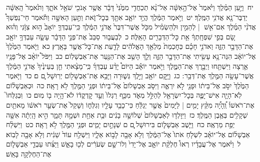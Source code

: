 \documentclass[18pt]{article}
\newcommand{\kri}[1]{\Afootnote{#1}}	%
\begin{document}
 {\loc יח~}וַיַּ֣עַן הַמֶּ֗לֶךְ וַיֹּ֙אמֶר֙ אֶל־הָ֣אִשָּׁ֔ה אַל־נָ֨א תְכַחֲדִ֤י מִמֶּ֙נִּי֙ דָּבָ֔ר אֲשֶׁ֥ר אָנֹכִ֖י שֹׁאֵ֣ל אֹתָ֑ךְ וַתֹּ֙אמֶר֙ הָֽאִשָּׁ֔ה יְדַבֶּר־נָ֖א אֲדֹנִ֥י הַמֶּֽלֶךְ׃ \startlock
 {\loc יט~}וַיֹּ֣אמֶר הַמֶּ֔לֶךְ הֲיַ֥ד יוֹאָ֛ב אִתָּ֖ךְ בְּכׇל־זֹ֑את וַתַּ֣עַן הָאִשָּׁ֣ה וַתֹּ֡אמֶר חֵי־נַפְשְׁךָ֩ אֲדֹנִ֨י הַמֶּ֜לֶךְ אִם־אִ֣שׁ  |  לְהֵמִ֣ין וּלְהַשְׂמִ֗יל מִכֹּ֤ל אֲשֶׁר־דִּבֶּר֙ אֲדֹנִ֣י הַמֶּ֔לֶךְ כִּֽי־עַבְדְּךָ֤ יוֹאָב֙ ה֣וּא צִוָּ֔נִי וְה֗וּא שָׂ֚ם בְּפִ֣י שִׁפְחָֽתְךָ֔ אֵ֥ת כׇּל־הַדְּבָרִ֖ים הָאֵֽלֶּה׃ \startlock
 {\loc כ~}לְבַעֲב֤וּר סַבֵּב֙ אֶת־פְּנֵ֣י הַדָּבָ֔ר עָשָׂ֛ה עַבְדְּךָ֥ יוֹאָ֖ב אֶת־הַדָּבָ֣ר הַזֶּ֑ה וַאדֹנִ֣י חָכָ֗ם כְּחׇכְמַת֙ מַלְאַ֣ךְ הָאֱלֹהִ֔ים לָדַ֖עַת אֶֽת־כׇּל־אֲשֶׁ֥ר בָּאָֽרֶץ׃ \startlock
 {\loc כא~}וַיֹּ֤אמֶר הַמֶּ֙לֶךְ֙ אֶל־יוֹאָ֔ב הִנֵּה־נָ֥א עָשִׂ֖יתִי אֶת־הַדָּבָ֣ר הַזֶּ֑ה וְלֵ֛ךְ הָשֵׁ֥ב אֶת־הַנַּ֖עַר אֶת־אַבְשָׁלֽוֹם׃ \startlock
 {\loc כב~}וַיִּפֹּל֩ יוֹאָ֨ב אֶל־פָּנָ֥יו אַ֛רְצָה וַיִּשְׁתַּ֖חוּ וַיְבָ֣רֶךְ אֶת־הַמֶּ֑לֶךְ וַיֹּ֣אמֶר יוֹאָ֡ב הַיּוֹם֩ יָדַ֨ע עַבְדְּךָ֜ כִּֽי־מָצָ֨אתִי חֵ֤ן בְּעֵינֶ֙יךָ֙ אֲדֹנִ֣י הַמֶּ֔לֶךְ אֲשֶׁר־עָשָׂ֥ה הַמֶּ֖לֶךְ אֶת־דְּבַ֥ר  \edtext{(עבדו)}{\kri{קרי: עַבְדֶּֽךָ}} ׃ \startlock
 {\loc כג~}וַיָּ֥קׇם יוֹאָ֖ב וַיֵּ֣לֶךְ גְּשׁ֑וּרָה וַיָּבֵ֥א אֶת־אַבְשָׁל֖וֹם יְרֽוּשָׁל ָֽ͏ְם ם׃ \startlock
 {\loc כד~}וַיֹּ֤אמֶר הַמֶּ֙לֶךְ֙ יִסֹּ֣ב אֶל־בֵּית֔וֹ וּפָנַ֖י לֹ֣א יִרְאֶ֑ה וַיִּסֹּ֤ב אַבְשָׁלוֹם֙ אֶל־בֵּית֔וֹ וּפְנֵ֥י הַמֶּ֖לֶךְ לֹ֥א רָאָֽה׃ \startlock
 {\loc כה~}וּכְאַבְשָׁל֗וֹם לֹֽא־הָיָ֧ה אִישׁ־יָפֶ֛ה בְּכׇל־יִשְׂרָאֵ֖ל לְהַלֵּ֣ל מְאֹ֑ד מִכַּ֤ף רַגְלוֹ֙ וְעַ֣ד קׇדְקֳד֔וֹ לֹא־הָ֥יָה ב֖וֹ מֽוּם׃ \startlock
 {\loc כו~}וּֽבְגַלְּחוֹ֮ אֶת־רֹאשׁוֹ֒ וְֽ֠הָיָ֠ה מִקֵּ֨ץ יָמִ֤ים  |  לַיָּמִים֙ אֲשֶׁ֣ר יְגַלֵּ֔חַ כִּי־כָבֵ֥ד עָלָ֖יו וְגִלְּח֑וֹ וְשָׁקַל֙ אֶת־שְׂעַ֣ר רֹאשׁ֔וֹ מָאתַ֥יִם שְׁקָלִ֖ים בְּאֶ֥בֶן הַמֶּֽלֶךְ׃ \startlock
 {\loc כז~}וַיִּוָּלְד֤וּ לְאַבְשָׁלוֹם֙ שְׁלוֹשָׁ֣ה בָנִ֔ים וּבַ֥ת אַחַ֖ת וּשְׁמָ֣הּ תָּמָ֑ר הִ֣יא הָֽיְתָ֔ה אִשָּׁ֖ה יְפַ֥ת מַרְאֶֽה׃ \startlock
 {\loc כח~}וַיֵּ֧שֶׁב אַבְשָׁל֛וֹם בִּירוּשָׁל ַ֖͏ְם ם שְׁנָתַ֣יִם יָמִ֑ים וּפְנֵ֥י הַמֶּ֖לֶךְ לֹ֥א רָאָֽה׃ \startlock
 {\loc כט~}וַיִּשְׁלַ֨ח אַבְשָׁל֜וֹם אֶל־יוֹאָ֗ב לִשְׁלֹ֤חַ אֹתוֹ֙ אֶל־הַמֶּ֔לֶךְ וְלֹ֥א אָבָ֖ה לָב֣וֹא אֵלָ֑יו וַיִּשְׁלַ֥ח עוֹד֙ שֵׁנִ֔ית וְלֹ֥א אָבָ֖ה לָבֽוֹא׃ \startlock
 {\loc ל~}וַיֹּ֨אמֶר אֶל־עֲבָדָ֜יו רְאוּ֩ חֶלְקַ֨ת יוֹאָ֤ב אֶל־יָדִי֙ וְלוֹ־שָׁ֣ם שְׂעֹרִ֔ים לְכ֖וּ  \edtext{(והוצתיה)}{\kri{קרי: וְהַצִּית֣וּהָ}}  בָאֵ֑שׁ וַיַּצִּ֜תוּ עַבְדֵ֧י אַבְשָׁל֛וֹם אֶת־הַחֶלְקָ֖ה בָּאֵֽשׁ׃ \startlock
\end{document}
